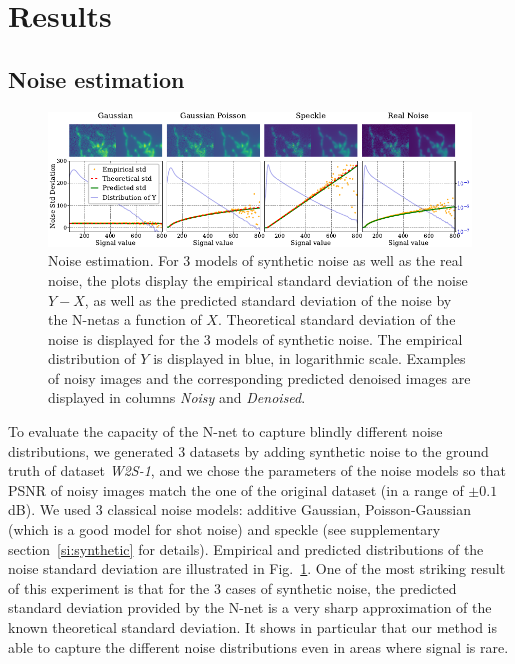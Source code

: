 \documentclass{article}
\begin{document}
\section{Results}
\label{sec:results}
\subsection{Noise estimation}

\begin{figure}
\begin{center}
\centerline{\includegraphics[width=\textwidth]{fig_noise_std_1col.pdf}}
\caption[Noise estimation]{Noise estimation.
For 3 models of synthetic noise as well as the real noise, the plots display the empirical standard deviation of the noise $Y - X$, as well as the predicted standard deviation of the noise by the N-net\protect\footnotemark as a function of $X$.
Theoretical standard deviation of the noise is displayed for the 3 models of synthetic noise.
The empirical distribution of $Y$ is displayed in blue, in logarithmic scale.
Examples of noisy images and the corresponding predicted denoised images are displayed in columns \textit{Noisy} and \textit{Denoised}.}
\label{fig:noisestd}
\end{center}
\vskip -0.2in
\end{figure}
To evaluate the capacity of the N-net to capture blindly different noise distributions, we generated 3 datasets by adding synthetic noise to the ground truth of dataset \textit{W2S-1}, and we chose the parameters of the noise models so that PSNR of noisy images match the one of the original dataset (in a range of $\pm0.1$dB).
We used 3 classical noise models: additive Gaussian, Poisson-Gaussian (which is a good model for shot noise) and speckle (see supplementary section~\ref{si:synthetic} for details).
Empirical and predicted distributions of the noise standard deviation are illustrated in Fig.~\ref{fig:noisestd}.
One of the most striking result of this experiment is that for the 3 cases of synthetic noise, the predicted standard deviation provided by the N-net is a very sharp approximation of the known theoretical standard deviation.
It shows in particular that our method is able to capture the different noise distributions even in areas where signal is rare.
\end{document}

